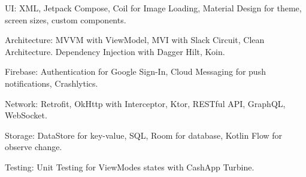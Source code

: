 \begin{cvparagraph}

UI: XML, Jetpack Compose, Coil for Image Loading, Material Design for theme, screen sizes, custom components.

Architecture: MVVM with ViewModel, MVI with Slack Circuit, Clean Architecture. Dependency Injection with Dagger Hilt, Koin.

Firebase: Authentication for Google Sign-In, Cloud Messaging for push notifications, Crashlytics.

Network: Retrofit, OkHttp with Interceptor, Ktor, RESTful API, GraphQL, WebSocket.

Storage: DataStore for key-value, SQL, Room for database, Kotlin Flow for observe change.

Testing: Unit Testing for ViewModes states with CashApp Turbine.

\end{cvparagraph}
